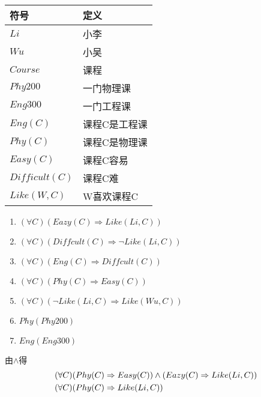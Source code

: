 \begin{answer}
	\ \\
	\begin{tabular}{ll}
		\hline
		符号&定义\\
		\hline
		$Li$&小李\\
		$Wu$&小吴\\
		$Course$&课程\\
		$Phy200$&一门物理课\\
		$Eng300$&一门工程课\\
		$Eng(C)$&课程C是工程课\\
		$Phy(C)$&课程C是物理课\\
		$Easy(C)$&课程C容易\\
		$Difficult(C)$&课程C难\\
		$Like(W,C)$&W喜欢课程C\\
		\hline
	\end{tabular}
	\begin{enumerate}[label=\circled{\arabic*}]
		\item $(\forall C) (Eazy(C) \Rightarrow Like(Li,C))$
		\item $(\forall C) (Diffcult(C) \Rightarrow \lnot Like(Li,C))$
		\item $(\forall C) (Eng(C) \Rightarrow Diffcult(C))$
		\item $(\forall C) (Phy(C) \Rightarrow Easy(C))$
		\item $(\forall C) (\lnot Like(Li,C) \Rightarrow Like(Wu,C))$
		\item $Phy(Phy200)$
		\item $Eng(Eng300)$
	\end{enumerate}
	由$\wedge$得
	\begin{align}
		(\forall C)& (Phy(C) \Rightarrow Easy(C)) \wedge (Eazy(C) \Rightarrow Like(Li,C)) \notag\\
		(\forall C)& (Phy(C) \Rightarrow Like(Li,C)) \notag
	\end{align}
	
\end{answer}
